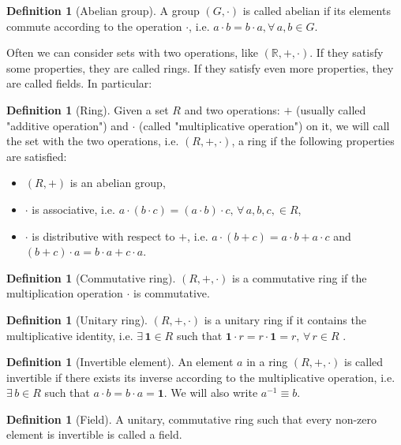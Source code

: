 \documentclass[a4paper,11pt,titlepage, article, oneside]{memoir}
\numberwithin{equation}{section}
\theoremstyle{definition}
\newtheorem{definition}[theorem]{Definition}
\theoremstyle{remark}
\begin{document}
\begin{definition} [Abelian group]
A group $(G, \cdot)$ is called abelian if its elements commute according to the operation $\cdot$, i.e. $a \cdot b = b \cdot a, \forall \,  a, b \in G$.
\end{definition}

Often we can consider sets with two operations, like $(\mathbb{R}, + , \cdot)$. If they satisfy some properties, they are called rings. If they satisfy even more properties, they are called fields. In particular:

\begin{definition} [Ring]
Given a set $R$ and two operations: $+$ (usually called "additive operation") and $\cdot$ (called "multiplicative operation") on it, we will call the set with the two operations, i.e. $(R, +, \cdot)$, a ring if the following properties are satisfied:
\begin{itemize}
\item $(R, +)$ is an abelian group,
\item $\cdot$ is associative, i.e. $a \cdot (b \cdot c) = (a \cdot b) \cdot c, \, \forall\, a, b, c, \in R$,
\item $\cdot$ is distributive with respect to $+$, i.e. $a \cdot (b + c) = a \cdot b + a \cdot c$ and $ (b + c) \cdot a = b \cdot a + c \cdot a$.
\end{itemize}
\end{definition}

\begin{definition} [Commutative ring] $(R, +, \cdot)$ is a commutative ring if the multiplication operation $\cdot$ is commutative.
\end{definition}

\begin{definition} [Unitary ring]
$(R, +, \cdot)$ is a unitary ring if it contains the multiplicative identity, i.e. $\exists\, \mathbf{1} \in R$ such that $\mathbf{1} \cdot r = r \cdot \mathbf{1} =  r, \, \forall\, r \in R$ .
\end{definition}

\begin{definition}[Invertible element]
An element $a$ in a ring $(R, +, \cdot)$ is called invertible if there exists its inverse according to the multiplicative operation, i.e. $\exists\, b \in R$ such that $a \cdot b = b \cdot a = \mathbf{1}$. We will also write $a^{-1} \equiv b$.
\end{definition}

\begin{definition} [Field]
A unitary, commutative ring such that every non-zero element is invertible is called a field.
\end{definition}
\end{document}
